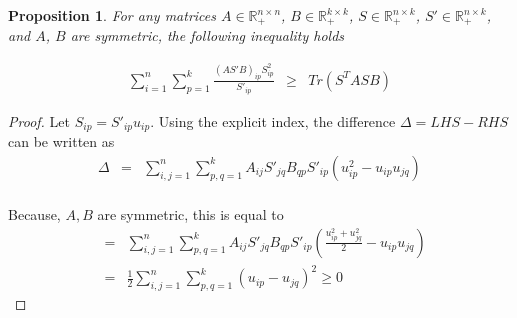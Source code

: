 \documentclass{article}
\newtheorem{proposition}{Proposition}
\begin{document}
\begin{proposition}
For any matrices $A \in \mathbb{R}^{n \times n}_{+}$, $B \in \mathbb{R}^{k \times k}_{+}$, $S \in \mathbb{R}^{n \times k}_{+}$, $S' \in \mathbb{R}^{n \times k}_{+}$, and $A$, $B$ are symmetric, the following inequality holds

\begin{equation}
    \begin{array}{lclcl}
        \sum_{i = 1}^{n} \sum_{p = 1}^{k} \frac{ (A S' B)_{ip} S^{2}_{ip} }{ S'_{ip} } & \geq & Tr(S^T A S B)
    \end{array}
\end{equation}
\end{proposition}

\begin{proof}
    Let $S_{ip} = S'_{ip} u_{ip}$. Using the explicit index, the difference $\Delta = LHS - RHS$ can be written as
    \begin{equation}
        \begin{array}{lclcl}
            \Delta & = & \sum_{i, j = 1}^{n} \sum_{p, q = 1}^{k} A_{ij} S'_{jq} B_{qp} S'_{ip} (u_{ip}^2 - u_{ip} u_{jq}) \\
        \end{array}
    \end{equation}

    Because, $A, B$ are symmetric, this is equal to
    \begin{equation}
        \begin{array}{lclcl}
                   & = & \sum_{i, j = 1}^{n} \sum_{p, q = 1}^{k} A_{ij} S'_{jq} B_{qp} S'_{ip} (\frac{u_{ip}^2 + u_{jq}^2}{2} - u_{ip} u_{jq}) \\
                   & = & \frac{1}{2} \sum_{i, j = 1}^{n} \sum_{p, q = 1}^{k} (u_{ip} - u_{jq})^2 \geq 0
        \end{array}
    \end{equation}
\end{proof}
\end{document}
